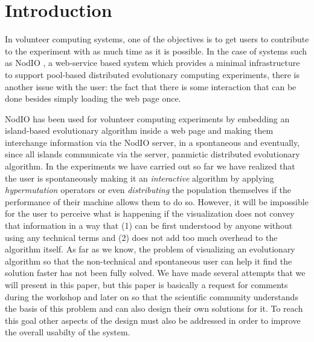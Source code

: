 \documentclass{sig-alternate}
\begin{document}


\section{Introduction}

In volunteer computing systems, one of the objectives is to get
users to contribute to the experiment with as much time as it is
possible. In the case of systems such as NodIO \cite{2016arXiv160101607M,DBLP:conf/gecco/GuervosG15}, 
a
web-service based system which
provides a minimal infrastructure to support pool-based distributed
evolutionary computing experiments, there is another issue with the 
user: the fact that there is some interaction that can be done besides
simply loading the web page once. 

NodIO 
has been used for volunteer computing experiments by
embedding an island-based evolutionary algorithm inside a web page and
making them interchange information via the NodIO server, in a
spontaneous and eventually, since all islands communicate via the
server, panmictic distributed evolutionary
algorithm. In the experiments we have carried out so far we have
realized %
that the user is spontaneously making it an {\em interactive}
algorithm %
by applying {\em hypermutation} 
operators or even {\em distributing} the population themselves if the 
performance of their machine allows them to do so. 
However, it will be impossible for the user to perceive what is
happening if the visualization does not convey that information in a
way that (1) can be first understood by anyone without using any technical
terms and (2) does not add too much overhead to the algorithm
itself. As far as we know, the problem of visualizing an evolutionary
algorithm so that the non-technical and spontaneous user can help it
find the solution faster has not been fully solved. We have made several
attempts that we will present in this paper, but this paper is
basically a request for comments during the workshop and later on so
that the scientific community understands the basis of this problem
and can also design their own solutions for it. To reach this goal
other aspects of the design must also be  addressed in order to
improve the overall usabilty of the system.
\end{document}
